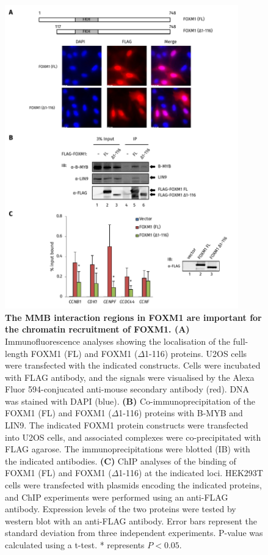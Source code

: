 \begin{figure}[!h]
    \centering
    \includegraphics[width=0.9\textwidth]{chapter3/figures_foxm1/fig32.pdf}
    \caption[The MMB interaction regions in FOXM1 are important for the chromatin recruitment of FOXM1]{\textbf{The MMB interaction regions in FOXM1 are important for the chromatin recruitment of FOXM1. (A)} Immunofluorescence analyses showing the localisation of the full-length FOXM1 (FL) and FOXM1 ($\Delta$1-116) proteins. U2OS cells were transfected with the indicated constructs. Cells were incubated with FLAG antibody, and the signals were visualised by the Alexa Fluor 594-conjucated anti-mouse secondary antibody (red). DNA was stained with DAPI (blue). \textbf{(B)} Co-immunoprecipitation of the FOXM1 (FL) and FOXM1 ($\Delta$1-116) proteins with B-MYB and LIN9. The indicated FOXM1 protein constructs were transfected into U2OS cells, and associated complexes were co-precipitated with FLAG agarose. The immunoprecipitations were blotted (IB) with the indicated antibodies. \textbf{(C)} ChIP analyses of the binding of FOXM1 (FL) and FOXM1 ($\Delta$1-116) at the indicated loci. HEK293T cells were transfected with plasmids encoding the indicated proteins, and ChIP experiments were performed using an anti-FLAG antibody. Expression levels of the two proteins were tested by western blot with an anti-FLAG antibody. Error bars represent the standard deviation from three independent experiments. P-value was calculated using a t-test. * represents $P<0.05$.}
    \label{fig:fig32}
\end{figure}

